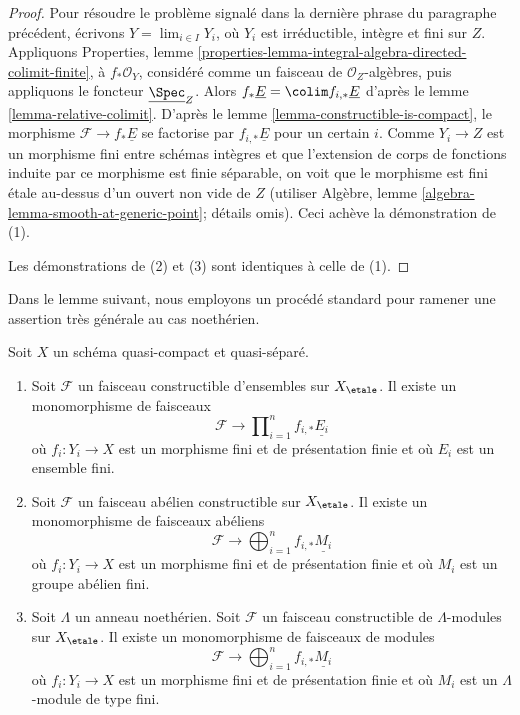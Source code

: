 \begin{proof}
\medskip\noindent
Pour résoudre le problème signalé dans la dernière phrase du paragraphe précédent,
écrivons $Y = \lim_{i \in I} Y_i$, où $Y_i$ est irréductible, intègre et
fini sur $Z$. Appliquons Properties, lemme
\ref{properties-lemma-integral-algebra-directed-colimit-finite},
à $f_*\mathcal{O}_Y$, considéré comme un faisceau de $\mathcal{O}_Z$-algèbres,
puis appliquons le foncteur $\underline{\Spec}_Z$.
Alors $f_*\underline{E} = \colim f_{i, *}\underline{E}$
d'après le lemme \ref{lemma-relative-colimit}.
D'après le lemme \ref{lemma-constructible-is-compact}, le morphisme
$\mathcal{F} \to f_*\underline{E}$
se factorise par $f_{i, *}\underline{E}$ pour un certain $i$.
Comme $Y_i \to Z$ est un morphisme fini entre schémas intègres
et que l'extension de corps de fonctions
induite par ce morphisme est finie séparable, on voit que le
morphisme est fini \'etale au-dessus d'un ouvert non vide de $Z$ (utiliser
Algèbre, lemme \ref{algebra-lemma-smooth-at-generic-point}; détails omis).
Ceci achève la démonstration de (1).

\medskip\noindent
Les démonstrations de (2) et (3) sont identiques à celle de (1).
\end{proof}

\noindent
Dans le lemme suivant, nous employons un procédé standard pour ramener une
assertion très générale au cas noethérien.

\begin{lemma}
\label{lemma-constructible-maps-into-constant-general}
\begin{reference}
\cite[Expos\'e IX, Proposition 2.14]{SGA4}
\end{reference}
Soit $X$ un schéma quasi-compact et quasi-séparé.
\begin{enumerate}
\item Soit $\mathcal{F}$ un faisceau constructible d'ensembles sur $X_\etale$.
Il existe un monomorphisme de faisceaux
$$
\mathcal{F} \longrightarrow
\prod\nolimits_{i = 1}^n f_{i, *}\underline{E_i}
$$
où $f_i : Y_i \to X$ est un morphisme fini et de présentation finie et où
$E_i$ est un ensemble fini.
\item Soit $\mathcal{F}$ un faisceau abélien constructible sur $X_\etale$.
Il existe un monomorphisme de faisceaux abéliens
$$
\mathcal{F} \longrightarrow
\bigoplus\nolimits_{i = 1}^n f_{i, *}\underline{M_i}
$$
où $f_i : Y_i \to X$ est un morphisme fini et de présentation finie et où
$M_i$ est un groupe abélien fini.
\item Soit $\Lambda$ un anneau noethérien.
Soit $\mathcal{F}$ un faisceau constructible de $\Lambda$-modules sur $X_\etale$.
Il existe un monomorphisme de faisceaux de modules
$$
\mathcal{F} \longrightarrow
\bigoplus\nolimits_{i = 1}^n f_{i, *}\underline{M_i}
$$
où $f_i : Y_i \to X$ est un morphisme fini et de présentation finie et où
$M_i$ est un $\Lambda$-module de type fini.
\end{enumerate}
\end{lemma}

